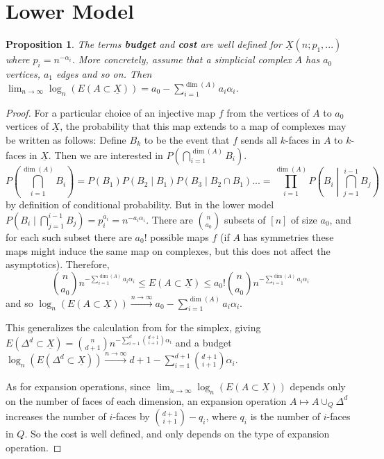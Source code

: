 \documentclass{article}
\newcommand{\prs}[1]{\left( #1 \right)}
\theoremstyle{plain}
\newtheorem{proposition}[theorem]{Proposition}
\theoremstyle{definition}
\theoremstyle{remark}
\newcommand{\di}{dimension}
\begin{document}
\section{Lower Model}\label{chap:lower}
\begin{proposition}\label{propBudCostLower}
    The terms \textbf{budget} and \textbf{cost} are well defined for $\underline{X}(n;p_1,...)$ where $p_i=n^{-\alpha_i}$.
    More concretely, assume that a simplicial complex $A$ has $a_0$ vertices, $a_1$ edges and so on. Then $\lim_{n\to \infty}\log_n(E(A\subset \underline{X}))=a_0-\sum_{i=1} ^{\dim(A)}a_i\alpha_i$.
\end{proposition}
\begin{proof} 
    For a particular choice of an injective map $f$ from the vertices of $A$ to $a_0$ vertices of $\underline{X}$, the probability that this map extends to a map of complexes may be written as follows: 
    Define $B_k$ to be the event that $f$ sends all $k$-faces in $A$ to $k$-faces in $\underline{X}$. Then we are interested in $P\prs{\bigcap_{i=1} ^{\dim(A)}B_i}$.
    $$P\prs{\bigcap_{i=1} ^{\dim(A)}B_i}=P(B_1)P(B_2\mid B_1)P(B_3\mid B_2\cap B_1)...=\prod_{i=1} ^{\dim(A)} P\prs{B_i\middle\lvert\bigcap_{j=1} ^{i-1}B_j}$$
    by definition of conditional probability. But in the lower model $P(B_i\mid \bigcap_{j=1} ^{i-1}B_j)=p_i ^{a_i}=n^{-a_i\alpha_i}$. There are $\binom{n}{a_0}$ subsets of $[n]$ of size $a_0$, and for each such subset there are $a_0!$ possible maps $f$ (if $A$ has symmetries these maps might induce the same map on complexes, but this does not affect the asymptotics). 
    Therefore, 
    $$\binom{n}{a_0}n^{-\sum_{i=1} ^{\dim(A)}a_i\alpha_i}\le E(A\subset \underline{X})\le a_0!\binom{n}{a_0}n^{-\sum_{i=1} ^{\dim(A)}a_i\alpha_i}$$ 
    and so $\log_n(E(A\subset \underline{X}))\xrightarrow{n\to \infty} a_0-\sum_{i=1} ^{\dim(A)}a_i\alpha_i$.\par
    This generalizes the calculation from \cite{Fowler19} for the simplex, giving $E(\Delta^d\subset \underline{X})=\binom{n}{d+1}n^{-\sum_{i=1} ^{d}\binom{d+1}{i+1}\alpha_i}$ and a budget $\log_n(E(\Delta^d\subset \underline{X}))\xrightarrow{n\to \infty} d+1-\sum_{i=1} ^{d+  1}\binom{d+1}{i+1}\alpha_i$.\par
    As for expansion operations, since $\lim_{n\to \infty}\log_n(E(A\subset \underline{X}))$ depends only on the number of faces of each \di, an expansion operation $A\mapsto A\cup_Q \Delta^d$ increases the number of $i$-faces by $\binom{d+1}{i+1}-q_i$, where $q_i$ is the number of $i$-faces in $Q$. So the cost is well defined, and only depends on the type of expansion operation.
\end{proof}
\end{document}
